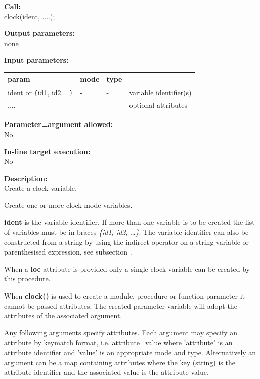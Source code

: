         {\bf Call:} \\
        clock(ident, ....);
        
        {\bf Output parameters:} \\
        none
        
        {\bf Input parameters:} \\
        \begin{tabular}{| l | l | l | l |}
        \hline
        param  & mode & type  & \\
        \hline \hline
        ident or \verb'{'id1, id2... \verb'}' & - &  -  & variable identifier(s)   \\ \hline
        .... & - & - & optional attributes \\ \hline
        \end{tabular}
        
        {\bf Parameter=argument allowed:} \\
        No
        
        {\bf In-line target execution:} \\
        No
        
        {\bf Description:} \\
        Create a clock variable.

        Create one or more clock mode variables.
        
        {\bf ident} is the variable identifier. If more than one
        variable is to be created the list of variables must be in braces
        {\em \{id1, id2, \dots\}}. The variable identifier can also be constructed
        from a string by using the indirect operator on a string variable or
        parenthesised expression, see subsection .
        
        When a {\bf loc} attribute is provided only a single clock variable
        can be created by this procedure.
        
        When {\bf clock()} is used to create a module, procedure or function
        parameter it cannot be passed attributes. The created parameter variable
        will adopt the attributes of the associated argument.
        
        Any following arguments specify attributes. Each argument may specify an
        attribute by keymatch format, i.e. attribute=value where 'attribute' is
        an attribute identifier and 'value' is an appropriate mode and type.
        Alternatively an argument can be a map containing attributes where the
        key (string) is the attribute identifier and the associated value is
        the attribute value.

